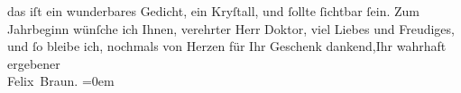 \begin{ledgroupsized}[t]{13cm}
           das iſt ein wunderbares Gedicht, ein Kryſtall, und ſollte ſichtbar ſein.\pend
           \pstart
           Zum Jahrbeginn wünſche ich Ihnen, verehrter Herr Doktor, viel Liebes und
               Freudiges, und ſo bleibe {\pb}ich, nochmals
               von Herzen für Ihr Geschenk dankend,\hspace*{1.5em}Ihr wahrhaft ergebener{\\[\baselineskip]}\spacefill\mbox{Felix Braun.}\pend
           \leftskip=0em{}\endnumbering{}\end{ledgroupsized}  \newcommand{\dateiname}{L02494}\newcommand{\titel}{Felix Braun an Arthur Schnitzler, 25. 12. 1927}\newcommand{\editorInnen}{Martin Anton Müller und Gerd-Hermann Susen}
            \footnotesize
\begin{ledgroupsized}[t]{11.5cm}
\end{ledgroupsized}
         
      